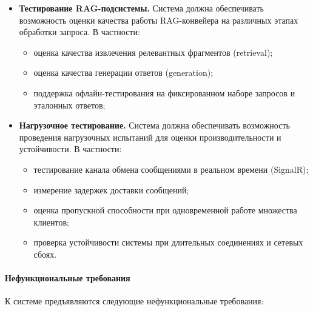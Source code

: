 \documentclass{article}
\begin{document}
\begin{itemize}
\item \textbf{Тестирование RAG-подсистемы.}  
Система должна обеспечивать возможность оценки качества работы RAG-конвейера на различных этапах обработки запроса. В частности:
\begin{itemize}
\item оценка качества извлечения релевантных фрагментов (retrieval);
\item оценка качества генерации ответов (generation);
\item поддержка офлайн-тестирования на фиксированном наборе запросов и эталонных ответов;
\end{itemize}

\item \textbf{Нагрузочное тестирование.}  
Система должна обеспечивать возможность проведения нагрузочных испытаний для оценки производительности и устойчивости. В частности:
\begin{itemize}
\item тестирование канала обмена сообщениями в реальном времени (SignalR);
\item измерение задержек доставки сообщений;
\item оценка пропускной способности при одновременной работе множества клиентов;
\item проверка устойчивости системы при длительных соединениях и сетевых сбоях.
\end{itemize}

\end{itemize}
\paragraph{Нефункциональные требования}

К системе предъявляются следующие нефункциональные требования:
\end{document}
